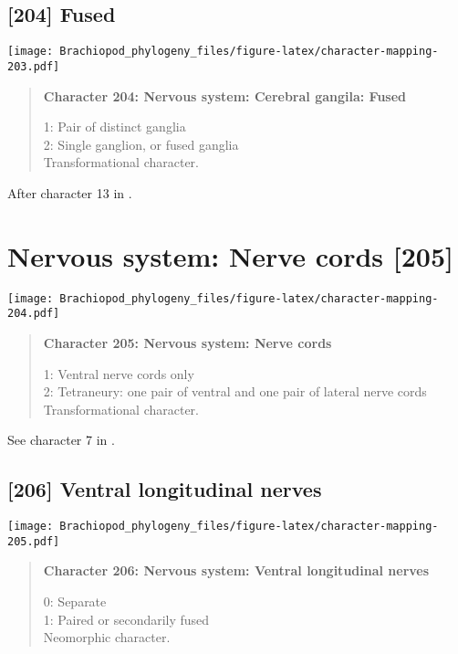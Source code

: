 \documentclass[openany]{book}
\theoremstyle{definition}
\theoremstyle{definition}
\theoremstyle{definition}
\theoremstyle{remark}
\begin{document}
\subsection*{{[}204{]} Fused}\label{fused}

\texttt{[image: Brachiopod\_phylogeny\_files/figure-latex/character-mapping-203.pdf]}

\begin{quote}
\textbf{Character 204: Nervous system: Cerebral gangila: Fused}

1: Pair of distinct ganglia\\
2: Single ganglion, or fused ganglia\\
Transformational character.
\end{quote}

After character 13 in \citet{Haszprunar1996}.

\section{Nervous system: Nerve cords
{[}205{]}}\label{nervous-system-nerve-cords-205}

\texttt{[image: Brachiopod\_phylogeny\_files/figure-latex/character-mapping-204.pdf]}

\begin{quote}
\textbf{Character 205: Nervous system: Nerve cords}

1: Ventral nerve cords only\\
2: Tetraneury: one pair of ventral and one pair of lateral nerve cords\\
Transformational character.
\end{quote}

See character 7 in \citet{Haszprunar2008}.

\subsection*{{[}206{]} Ventral longitudinal
nerves}\label{ventral-longitudinal-nerves}

\texttt{[image: Brachiopod\_phylogeny\_files/figure-latex/character-mapping-205.pdf]}

\begin{quote}
\textbf{Character 206: Nervous system: Ventral longitudinal nerves}

0: Separate\\
1: Paired or secondarily fused\\
Neomorphic character.
\end{quote}
\end{document}
